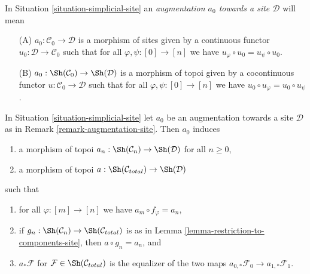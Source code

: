 \begin{remark}
\label{remark-augmentation-site}
In Situation \ref{situation-simplicial-site} an
{\it augmentation $a_0$ towards a site $\mathcal{D}$} will mean
\begin{enumerate}
\item[(A)] $a_0 : \mathcal{C}_0 \to \mathcal{D}$ is a morphism of sites
given by a continuous functor $u_0 : \mathcal{D} \to \mathcal{C}_0$
such that for all $\varphi, \psi : [0] \to [n]$ we have
$u_\varphi \circ u_0 = u_\psi \circ u_0$.
\item[(B)] $a_0 : \Sh(\mathcal{C}_0) \to \Sh(\mathcal{D})$ is a morphism
of topoi given by a cocontinuous functor $u : \mathcal{C}_0 \to \mathcal{D}$
such that for all $\varphi, \psi : [0] \to [n]$ we have
$u_0 \circ u_\varphi = u_0 \circ u_\psi$.
\end{enumerate}
\end{remark}

\begin{lemma}
\label{lemma-augmentation-site}
In Situation \ref{situation-simplicial-site} let $a_0$ be an
augmentation towards a site $\mathcal{D}$ as in
Remark \ref{remark-augmentation-site}. Then $a_0$ induces
\begin{enumerate}
\item a morphism of topoi $a_n : \Sh(\mathcal{C}_n) \to \Sh(\mathcal{D})$
for all $n \geq 0$,
\item a morphism of topoi $a : \Sh(\mathcal{C}_{total}) \to \Sh(\mathcal{D})$
\end{enumerate}
such that
\begin{enumerate}
\item for all $\varphi : [m] \to [n]$ we have $a_m \circ f_\varphi = a_n$,
\item if $g_n : \Sh(\mathcal{C}_n) \to \Sh(\mathcal{C}_{total})$
is as in Lemma \ref{lemma-restriction-to-components-site}, then
$a \circ g_n = a_n$, and
\item $a_*\mathcal{F}$ for $\mathcal{F} \in \Sh(\mathcal{C}_{total})$
is the equalizer of the two maps
$a_{0, *}\mathcal{F}_0 \to a_{1, *}\mathcal{F}_1$.
\end{enumerate}
\end{lemma}

